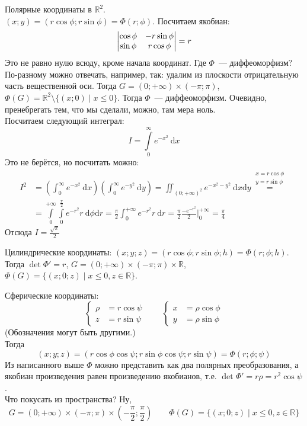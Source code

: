 \documentclass{article}
\let\tmp\varphi
\let\varphi\phi
\let\phi\tmp
\begin{document}
    \begin{example}
        Полярные координаты в $\mathbb R^2$.\\
        $(x;y)=(r\cos\varphi;r\sin\varphi)=\Phi(r;\varphi)$. Посчитаем якобиан:
        $$
        \matrd{\cos\varphi & -r\sin\varphi\\\sin\varphi & r\cos\varphi}=r
        $$
        Это не равно нулю всюду, кроме начала координат. Где $\Phi$~--- диффеоморфизм? По-разному можно отвечать, например, так: удалим из плоскости отрицательную часть вещественной оси. Тогда $G=(0;+\infty)\times(-\pi;\pi)$, $\Phi(G)=\mathbb R^2\setminus\{(x;0)\mid x\leqslant0\}$. Тогда $\Phi$~--- диффеоморфизм. Очевидно, пренебрегать тем, что мы сделали, можно, там мера ноль.\\
        Посчитаем следующий интеграл:
        $$
        I=\int\limits_0^\infty e^{-x^2}~\mathrm dx
        $$
        Это не берётся, но посчитать можно:
        \[\begin{split}
            I^2&=\left(\int_0^\infty e^{-x^2}~\mathrm dx\right)\left(\int_0^\infty e^{-y^2}~\mathrm dy\right)=\iint_{(0;+\infty)^2}e^{-x^2-y^2}~\mathrm dx\mathrm dy\overset{\substack{x=r\cos\varphi\\y=r\sin\varphi}}=\\
            &=\int\limits_0^{+\infty}\int\limits_0^{\frac\pi2}e^{-r^2}r~\mathrm d\varphi\mathrm dr=\frac\pi2\int_0^{+\infty}e^{-r^2}r~\mathrm dr=\frac\pi2\frac{-e^{-r^2}}2\bigg|_{0}^{+\infty}=\frac\pi4
        \end{split}\]
        Отсюда $I=\frac{\sqrt\pi}2$
    \end{example}
    \begin{example}
        Цилиндрические координаты: $(x;y;z)=(r\cos\varphi;r\sin\varphi;h)=\Phi(r;\varphi;h)$. Тогда $\det\Phi'=r$, $G=(0;+\infty)\times(-\pi;\pi)\times\mathbb R$, $\Phi(G)=\{(x;0;z)\mid x\leqslant 0,z\in\mathbb R\}$.
    \end{example}
    \begin{example}
        Сферические координаты: %
        $$
        \left\{\begin{aligned}
            \rho&=r\cos\psi\\
            z&=r\sin\psi
        \end{aligned}\right.\qquad
        \left\{\begin{aligned}
            x&=\rho\cos\varphi\\
            y&=\rho\sin\varphi
        \end{aligned}\right.
        $$
        (Обозначения могут быть другими.)\\
        Тогда
        $$
        (x;y;z)=(r\cos\varphi\cos\psi;r\sin\varphi\cos\psi;r\sin\psi)=\Phi(r;\varphi;\psi)
        $$
        Из написанного выше $\Phi$ можно представить как два полярных преобразования, а якобиан произведения равен произведению якобианов, т.е. $\det\Phi'=r\rho=r^2\cos\psi$.\\
        Что покусать из пространства? Ну,
        $$
        G=(0;+\infty)\times(-\pi;\pi)\times\left(-\frac\pi2;\frac\pi2\right)\qquad\Phi(G)=\{(x;0;z)\mid x\leqslant 0,z\in\mathbb R\}
        $$
    \end{example}
\end{document}
